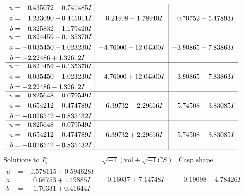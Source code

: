 \documentclass[1p]{elsarticle_modified}
\theoremstyle{definition}
\newcommand{\I}{\sqrt{-1}}
\begin{document}
$$\begin{array}{c|c|c}
\begin{aligned}
u &= \phantom{-}0.435072 - 0.741485 I \\
a &= \phantom{-}1.233090 + 0.445011 I \\
b &= \phantom{-}0.325832 - 1.179420 I\end{aligned}
 & \phantom{-}0.21908 - 1.78940 I & \phantom{-}0.70752 + 5.47893 I \\ \hline\begin{aligned}
u &= \phantom{-}0.824459 + 0.135370 I \\
a &= -0.035450 - 1.023230 I \\
b &= -2.22486 + 1.32612 I\end{aligned}
 & -4.76000 - 12.04300 I & -3.90865 + 7.83863 I \\ \hline\begin{aligned}
u &= \phantom{-}0.824459 - 0.135370 I \\
a &= -0.035450 + 1.023230 I \\
b &= -2.22486 - 1.32612 I\end{aligned}
 & -4.76000 + 12.04300 I & -3.90865 - 7.83863 I \\ \hline\begin{aligned}
u &= -0.825648 + 0.079549 I \\
a &= \phantom{-}0.654212 + 0.474789 I \\
b &= -0.026542 + 0.835432 I\end{aligned}
 & -6.39732 - 2.29666 I & -5.74508 + 3.83085 I \\ \hline\begin{aligned}
u &= -0.825648 - 0.079549 I \\
a &= \phantom{-}0.654212 - 0.474789 I \\
b &= -0.026542 - 0.835432 I\end{aligned}
 & -6.39732 + 2.29666 I & -5.74508 - 3.83085 I\\
 \hline 
 \end{array}$$\newpage$$\begin{array}{c|c|c}  
\text{Solutions to }I^u_{1}& \I (\text{vol} + \sqrt{-1}CS) & \text{Cusp shape}\\
 \hline 
\begin{aligned}
u &= -0.578115 + 0.594628 I \\
a &= \phantom{-}0.66753 + 1.49885 I \\
b &= \phantom{-}1.70331 + 0.41644 I\end{aligned}
 & -0.16037 + 7.14748 I & -0.19098 - 4.78426 I \\ \hline\begin{aligned}

\end{aligned}
\end{array}$$
\end{document}
